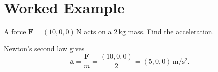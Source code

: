 \section{Worked Example}

\begin{examplebox}
A force \(\mathbf F=(10,0,0)\,\mathrm N\) acts on a \(2\,\mathrm{kg}\) mass.
Find the acceleration.
\end{examplebox}

\begin{solutionbox}
Newton's second law gives
\[
\mathbf a=\frac{\mathbf F}{m}
=\frac{(10,0,0)}{2}
=(5,0,0)\,\mathrm{m/s^2}.
\]
\end{solutionbox}

